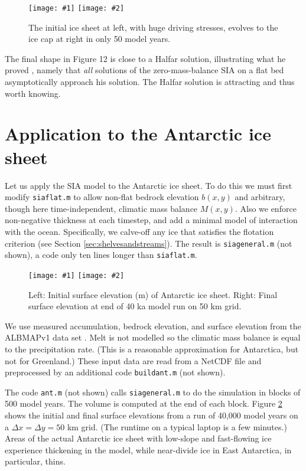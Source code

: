 \documentclass[letterpaper,final,12pt,reqno]{amsart}
\newcommand{\twofigsizes}[5]{
\begin{figure}[ht]
\centering
\texttt{[image: \#1]} \quad
\texttt{[image: \#2]}
\caption{#3}
\label{fig:#1}
\end{figure}}
\begin{document}
\twofigsizes{roughinitial}{roughfinal}{The initial ice sheet at left, with huge driving stresses, evolves to the ice cap at right in only 50 model years.}{2.9in}{2.9in}

The final shape in Figure 12 is close to a Halfar solution, illustrating what he proved \cite{Halfar81,Halfar83}, namely that \emph{all} solutions of the zero-mass-balance SIA on a flat bed asymptotically approach his solution.  The Halfar solution is attracting and thus worth knowing.

\section{Application to the Antarctic ice sheet}   \label{sec:antapp}

Let us apply the SIA model to the Antarctic ice sheet.  To do this we must first modify \texttt{siaflat.m} to allow non-flat bedrock elevation $b(x,y)$ and arbitrary, though here time-independent, climatic mass balance $M(x,y)$.  Also we enforce non-negative thickness at each timestep, and add a minimal model of interaction with the ocean.  Specifically, we calve-off any ice that satisfies the flotation criterion (see Section \ref{sec:shelvesandstreams}).  The result is \texttt{siageneral.m} (not shown), a code only ten lines longer than \texttt{siaflat.m}.

\twofigsizes{antinitial}{antfinal}{Left: Initial surface elevation (m) of Antarctic ice sheet.  Right: Final surface elevation at end of 40 ka model run on 50 km grid.}{2.55in}{3.2in}

We use measured accumulation, bedrock elevation, and surface elevation from the ALBMAPv1 data set \cite{LeBrocqetal2010}.  Melt is not modelled so the climatic mass balance is equal to the precipitation rate.  (This is a reasonable approximation for Antarctica, but not for Greenland.)  These input data are read from a NetCDF file and preprocessed by an additional code \texttt{buildant.m} (not shown).

The code \texttt{ant.m} (not shown) calls \texttt{siageneral.m} to do the simulation in blocks of 500 model years.  The volume is computed at the end of each block.  Figure \ref{fig:antinitial} shows the initial and final surface elevations from a run of 40,000 model years on a $\Delta x = \Delta y = 50$ km grid.  (The runtime on a typical laptop is a few minutes.)  Areas of the actual Antarctic ice sheet with low-slope and fast-flowing ice experience thickening in the model, while near-divide ice in East Antarctica, in particular, thins.
\end{document}
